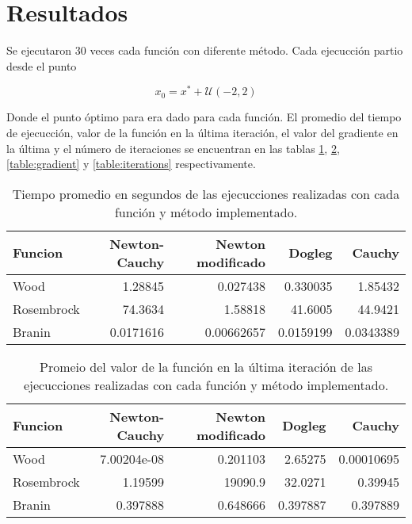 \section{Resultados}

Se ejecutaron 30 veces cada función con diferente método. Cada ejecucción partio desde el punto

\begin{equation*}
    x_0 = x^* + \mathcal{U}(-2,2)
\end{equation*}

Donde el punto óptimo para era dado para cada función. El promedio del tiempo de ejecucción, valor de la función en la última iteración, el valor del gradiente en la última y el número de iteraciones se encuentran en las tablas \ref{table:time}, \ref{table:function}, \ref{table:gradient} y \ref{table:iterations} respectivamente.

\begin{table}[H]
    \centering
    \begin{tabular}{lrrrr}
        \hline
        \textbf{Funcion} & \textbf{Newton-Cauchy} & \textbf{Newton modificado} & \textbf{Dogleg} & \textbf{Cauchy} \\
        \hline
        Wood             & 1.28845                & 0.027438                   & 0.330035        & 1.85432         \\
        Rosembrock       & 74.3634                & 1.58818                    & 41.6005         & 44.9421         \\
        Branin           & 0.0171616              & 0.00662657                 & 0.0159199       & 0.0343389       \\
        \hline
    \end{tabular}
    \caption{Tiempo promedio en segundos de las ejecucciones realizadas con cada función y método implementado.}
    \label{table:time}
\end{table}

\begin{table}[H]
    \centering
    \begin{tabular}{lrrrr}
        \hline
        \textbf{Funcion} & \textbf{Newton-Cauchy} & \textbf{Newton modificado} & \textbf{Dogleg} & \textbf{Cauchy} \\
        \hline
        Wood             & 7.00204e-08            & 0.201103                   & 2.65275         & 0.00010695      \\
        Rosembrock       & 1.19599                & 19090.9                    & 32.0271         & 0.39945         \\
        Branin           & 0.397888               & 0.648666                   & 0.397887        & 0.397889        \\
        \hline
    \end{tabular}
    \caption{Promeio del valor de la función en la última iteración de las ejecucciones realizadas con cada función y método implementado.}
    \label{table:function}
\end{table}

